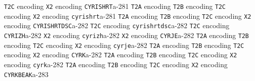 \documentclass[twoside]{ltxdoc}
\makeatletter
\renewenvironment{theindex}{%
   \@restonecoltrue
   \if@twocolumn\@restonecolfalse\fi
   \columnseprule \z@
   \columnsep 35\p@
   \twocolumn[\index@prologue]%
   \IndexParms
   \let\item\@idxitem
   \ignorespaces
}{\if@restonecol\onecolumn\else\clearpage\fi}
\makeatother
\begin{document}
\begin{theindex}
    \subitem \texttt  {T2C} encoding\pfill {}
    \subitem \texttt  {X2} encoding\pfill {}
  \item \texttt  {CYRISHRT}\pfill a-281
    \subitem \texttt  {T2A} encoding\pfill {}
    \subitem \texttt  {T2B} encoding\pfill {}
    \subitem \texttt  {T2C} encoding\pfill {}
    \subitem \texttt  {X2} encoding\pfill {}
  \item \texttt  {cyrishrt}\pfill a-281
    \subitem \texttt  {T2A} encoding\pfill {}
    \subitem \texttt  {T2B} encoding\pfill {}
    \subitem \texttt  {T2C} encoding\pfill {}
    \subitem \texttt  {X2} encoding\pfill {}
  \item \texttt  {CYRISHRTDSC}\pfill a-282
    \subitem \texttt  {T2C} encoding\pfill {}
  \item \texttt  {cyrishrtdsc}\pfill a-282
    \subitem \texttt  {T2C} encoding\pfill {}
  \item \texttt  {CYRIZH}\pfill a-282
    \subitem \texttt  {X2} encoding\pfill {}
  \item \texttt  {cyrizh}\pfill a-282
    \subitem \texttt  {X2} encoding\pfill {}
  \item \texttt  {CYRJE}\pfill a-282
    \subitem \texttt  {T2A} encoding\pfill {}
    \subitem \texttt  {T2B} encoding\pfill {}
    \subitem \texttt  {T2C} encoding\pfill {}
    \subitem \texttt  {X2} encoding\pfill {}
  \item \texttt  {cyrje}\pfill a-282
    \subitem \texttt  {T2A} encoding\pfill {}
    \subitem \texttt  {T2B} encoding\pfill {}
    \subitem \texttt  {T2C} encoding\pfill {}
    \subitem \texttt  {X2} encoding\pfill {}
  \item \texttt  {CYRK}\pfill a-282
    \subitem \texttt  {T2A} encoding\pfill {}
    \subitem \texttt  {T2B} encoding\pfill {}
    \subitem \texttt  {T2C} encoding\pfill {}
    \subitem \texttt  {X2} encoding\pfill {}
  \item \texttt  {cyrk}\pfill a-282
    \subitem \texttt  {T2A} encoding\pfill {}
    \subitem \texttt  {T2B} encoding\pfill {}
    \subitem \texttt  {T2C} encoding\pfill {}
    \subitem \texttt  {X2} encoding\pfill {}
  \item \texttt  {CYRKBEAK}\pfill a-283

\end{theindex}
\end{document}
